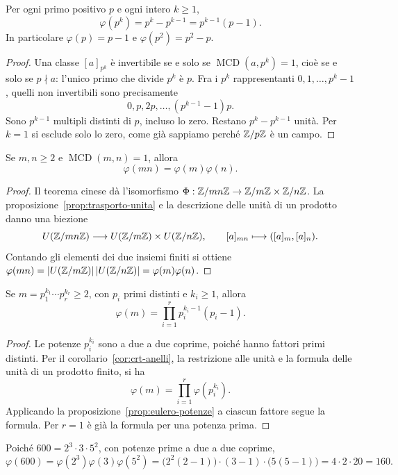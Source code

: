 \begin{proposizione}\label{prop:eulero-potenze}
Per ogni primo positivo $p$ e ogni intero $k\ge1$,
\[
\varphi(p^k)=p^k-p^{k-1}=p^{k-1}(p-1).
\]
In particolare $\varphi(p)=p-1$ e $\varphi(p^2)=p^2-p$.
\end{proposizione}
\begin{proof}
Una classe $[a]_{p^k}$ è invertibile se e solo se $\operatorname{MCD}(a,p^k)=1$, cioè se e solo se $p\nmid a$: l'unico primo che divide $p^k$ è $p$. Fra i $p^k$ rappresentanti $0,1,\ldots,p^k-1$, quelli non invertibili sono precisamente
\[
0,p,2p,\ldots,(p^{k-1}-1)p.
\]
Sono $p^{k-1}$ multipli distinti di $p$, incluso lo zero. Restano $p^k-p^{k-1}$ unità. Per $k=1$ si esclude solo lo zero, come già sappiamo perché $\mathbb{Z}/p\mathbb{Z}$ è un campo.
\end{proof}

\begin{proposizione}\label{prop:eulero-coprimi}
Se $m,n\ge2$ e $\operatorname{MCD}(m,n)=1$, allora
\[
\varphi(mn)=\varphi(m)\varphi(n).
\]
\end{proposizione}
\begin{proof}
Il teorema cinese dà l'isomorfismo $\Phi:\mathbb{Z}/mn\mathbb{Z}\to\mathbb{Z}/m\mathbb{Z}\times\mathbb{Z}/n\mathbb{Z}$. La proposizione~\ref{prop:trasporto-unita} e la descrizione delle unità di un prodotto danno una biezione
\[
U(\mathbb{Z}/mn\mathbb{Z})\longrightarrow U(\mathbb{Z}/m\mathbb{Z})\times U(\mathbb{Z}/n\mathbb{Z}),
\qquad [a]_{mn}\longmapsto([a]_m,[a]_n).
\]
Contando gli elementi dei due insiemi finiti si ottiene $\varphi(mn)=|U(\mathbb{Z}/m\mathbb{Z})|\,|U(\mathbb{Z}/n\mathbb{Z})|=\varphi(m)\varphi(n)$.
\end{proof}

\begin{corollario}
Se $m=p_1^{k_1}\cdots p_r^{k_r}\ge2$, con $p_i$ primi distinti e $k_i\ge1$, allora
\[
\varphi(m)=\prod_{i=1}^r p_i^{k_i-1}(p_i-1).
\]
\end{corollario}
\begin{proof}
Le potenze $p_i^{k_i}$ sono a due a due coprime, poiché hanno fattori primi distinti. Per il corollario~\ref{cor:crt-anelli}, la restrizione alle unità e la formula delle unità di un prodotto finito, si ha
\[
\varphi(m)=\prod_{i=1}^r\varphi(p_i^{k_i}).
\]
Applicando la proposizione~\ref{prop:eulero-potenze} a ciascun fattore segue la formula. Per $r=1$ è già la formula per una potenza prima.
\end{proof}

\begin{esempio}
Poiché $600=2^3\cdot3\cdot5^2$, con potenze prime a due a due coprime,
\[
\varphi(600)=\varphi(2^3)\varphi(3)\varphi(5^2)
           =\bigl(2^2(2-1)\bigr)\cdot(3-1)\cdot\bigl(5(5-1)\bigr)
           =4\cdot2\cdot20=160.
\]
\end{esempio}

